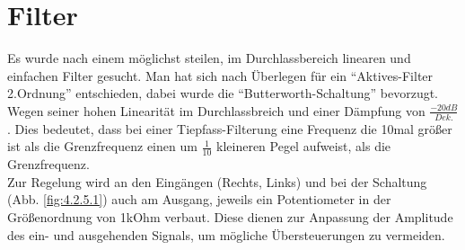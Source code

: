 \section{Filter}\label{sec:8.4}
Es wurde nach einem möglichst steilen, im Durchlassbereich linearen und einfachen Filter gesucht.
Man hat sich nach Überlegen für ein \enquote{Aktives-Filter 2.Ordnung} entschieden, dabei wurde die \enquote{Butterworth-Schaltung} bevorzugt.
Wegen seiner hohen Linearität im Durchlassbreich und einer Dämpfung von $\frac{-20dB}{Dek.}$ .
Dies bedeutet, dass bei einer Tiepfass-Filterung eine Frequenz die 10mal größer ist als die Grenzfrequenz einen um $\frac{1}{10}$ kleineren Pegel aufweist, als die Grenzfrequenz.\\
Zur Regelung wird an den Eingängen (Rechts, Links) und bei der Schaltung (Abb. \ref{fig:4.2.5.1}) auch am Ausgang, jeweils ein Potentiometer in der Größenordnung von 1kOhm verbaut.
Diese dienen zur Anpassung der Amplitude des ein- und ausgehenden Signals, um mögliche Übersteuerungen zu vermeiden.

